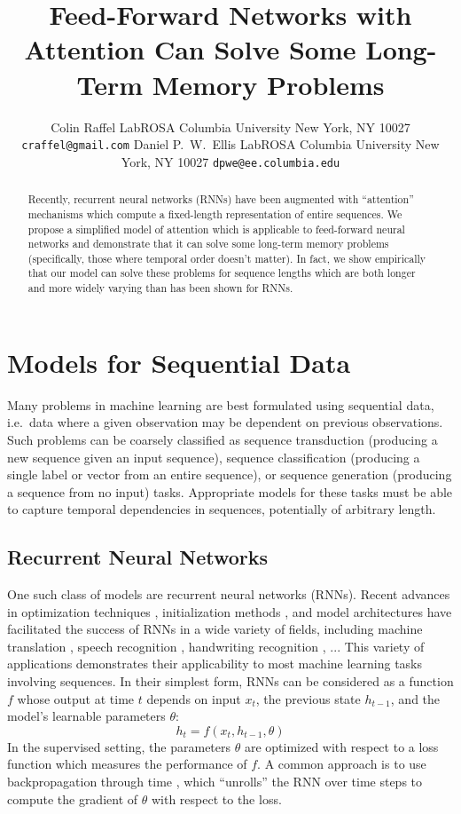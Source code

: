 \documentclass{article} %
\title{Feed-Forward Networks with Attention Can Solve Some Long-Term Memory Problems}
\author{
Colin Raffel
LabROSA
Columbia University
New York, NY 10027
\texttt{craffel@gmail.com}
\And
Daniel P.~W.~Ellis
LabROSA
Columbia University
New York, NY 10027
\texttt{dpwe@ee.columbia.edu}
}
\begin{document}
\maketitle

\begin{abstract}
Recently, recurrent neural networks (RNNs) have been augmented with ``attention'' mechanisms which compute a fixed-length representation of entire sequences.
We propose a simplified model of attention which is applicable to feed-forward neural networks and demonstrate that it can solve some long-term memory problems (specifically, those where temporal order doesn't matter).
In fact, we show empirically that our model can solve these problems for sequence lengths which are both longer and more widely varying than has been shown for RNNs.
\end{abstract}

\section{Models for Sequential Data}

Many problems in machine learning are best formulated using sequential data, i.e.\ data where a given observation may be dependent on previous observations.
Such problems can be coarsely classified as sequence transduction (producing a new sequence given an input sequence), sequence classification (producing a single label or vector from an entire sequence), or sequence generation (producing a sequence from no input) tasks.
Appropriate models for these tasks must be able to capture temporal dependencies in sequences, potentially of arbitrary length.

\subsection{Recurrent Neural Networks}

One such class of models are recurrent neural networks (RNNs).
Recent advances in optimization techniques \cite{}, initialization methods \cite{}, and model architectures \cite{} have facilitated the success of RNNs in a wide variety of fields, including machine translation \cite{}, speech recognition \cite{}, handwriting recognition \cite{}, ...
This variety of applications demonstrates their applicability to most machine learning tasks involving sequences.
In their simplest form, RNNs can be considered as a function $f$ whose output at time $t$ depends on input $x_t$, the previous state $h_{t - 1}$, and the model's learnable parameters $\theta$:
$$
h_t = f(x_t, h_{t - 1}, \theta)
$$
In the supervised setting, the parameters $\theta$ are optimized with respect to a loss function which measures the performance of $f$.
A common approach is to use backpropagation through time \cite{}, which ``unrolls'' the RNN over time steps to compute the gradient of $\theta$ with respect to the loss.
\end{document}
